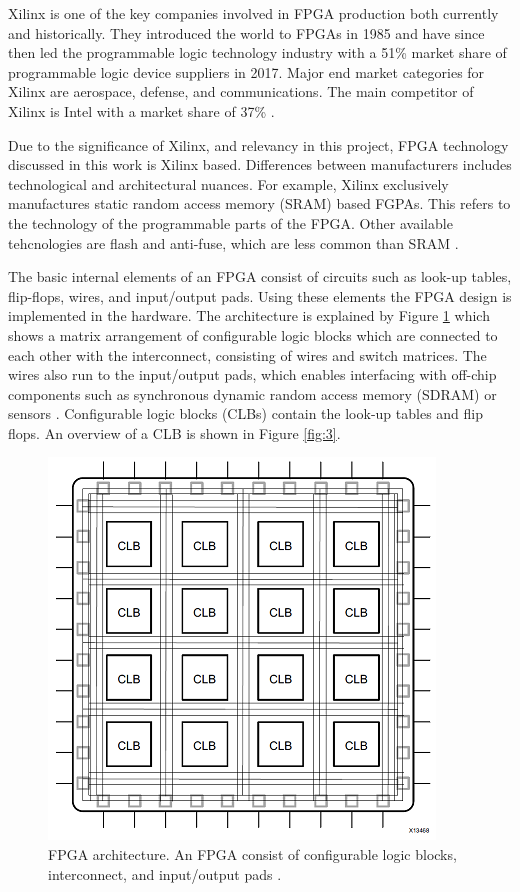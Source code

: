 \documentclass[12pt]{report}
\begin{document}
\par
Xilinx is one of the key companies involved in FPGA production both currently and historically. They introduced the world to FPGAs in 1985 and have since then led the programmable logic technology industry with a 51\% market share of programmable logic device suppliers in 2017. Major end market categories for Xilinx are aerospace, defense, and communications. The main competitor of Xilinx is Intel with a market share of 37\% \citep{XilHist}\citep{XilShare}.
\par 
Due to the significance of Xilinx, and relevancy in this project, FPGA technology discussed in this work is Xilinx based. Differences between manufacturers includes technological and architectural nuances. For example, Xilinx exclusively manufactures static random access memory (SRAM) based FGPAs. This refers to the technology of the programmable parts of the FPGA. Other available tehcnologies are flash and anti-fuse, which are less common than SRAM \citep{FPGAarch1}.
\par
The basic internal elements of an FPGA consist of circuits such as look-up tables, flip-flops, wires, and input/output pads. Using these elements the FPGA design is implemented in the hardware.
The architecture is explained by Figure \ref{fig:2} which shows a matrix arrangement of configurable logic blocks which are connected to each other with the interconnect, consisting of wires and switch matrices. The wires also run to the input/output pads, which enables interfacing with off-chip components such as synchronous dynamic random access memory (SDRAM) or sensors \citep{XilFPGAIntro}. Configurable logic blocks (CLBs) contain the look-up tables and flip flops. An overview of a CLB is shown in Figure \ref{fig:3}.

\begin{figure}[h]
    \centering
    \includegraphics[scale=0.55]{figures/basic_fpga.png}
    \caption{FPGA architecture. An FPGA consist of configurable logic blocks, interconnect, and input/output pads \citep{XilFPGAIntro}.}
    \label{fig:2}
\end{figure}
\end{document}
